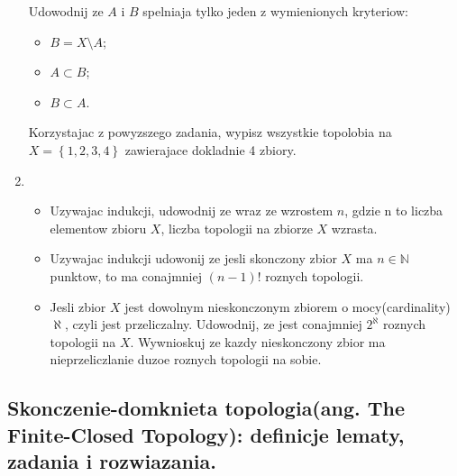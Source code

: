 \documentclass{article}
\begin{document}
\begin{enumerate}
Udowodnij ze $A$ i $B$ spelniaja tylko jeden z wymienionych kryteriow:
\begin{itemize}
    \item $B = X \setminus A$;
    \item $A \subset B$;
    \item $B \subset A$.
\end{itemize}

Korzystajac z powyzszego zadania, wypisz wszystkie topolobia na $X = \left\{ 1,2,3,4 \right\}$ zawierajace dokladnie 4 zbiory.

\item
    \begin{itemize}
        \item Uzywajac indukcji, udowodnij ze wraz ze wzrostem $n$, gdzie n to liczba elementow zbioru $X$, liczba topologii na zbiorze $X$ wzrasta.
        \item Uzywajac indukcji udowonij ze jesli skonczony zbior $X$ ma $n \in \mathbb{N}$ punktow, to ma conajmniej $(n-1)!$ roznych topologii.
        \item Jesli zbior $X$ jest dowolnym nieskonczonym zbiorem o mocy(cardinality) $\aleph$, czyli jest przeliczalny. Udowodnij, ze jest conajmniej $2^{\aleph}$ roznych topologii na $X$. Wywnioskuj ze kazdy nieskonczony zbior ma nieprzeliczlanie duzoe roznych topologii na sobie.
    \end{itemize}
\end{enumerate}%
\subsection{Skonczenie-domknieta topologia(ang. The Finite-Closed Topology): definicje lematy, zadania i rozwiazania.}
\end{document}
